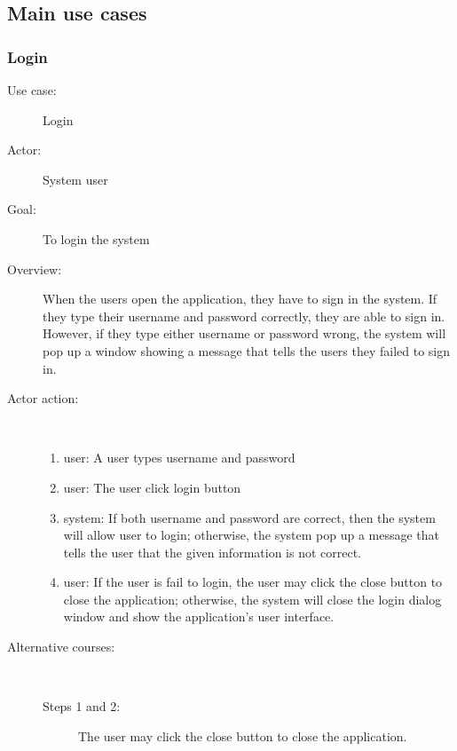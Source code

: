 \documentclass[11pt, oneside]{article}   	%
\begin{document}

\subsection{Main use cases}

\subsubsection{Login}
\begin{description}
\item[Use case:] Login
\item[Actor:] System user
\item[Goal:] To login the system
\item[Overview:] When the users open the application, they have to sign in the system. 
If they type their username and password correctly, they are able to sign in. 
However, if they type either username or password wrong, the system will pop up a window showing a message that tells the users they failed to sign in.
\item[Actor action:]
\
\begin{enumerate}
\item user: A user types username and password
\item user: The user click login button
\item system: If both username and password are correct, then the system will allow user to login; otherwise, the system pop up a message that tells the user that the given information is not correct.
\item user: If the user is fail to login, the user may click the close button to close the application; otherwise, the system will close the login dialog window and show the application's user interface.
\end{enumerate}

\item[Alternative courses:]
\
\begin{description}
\item[Steps 1 and 2:] The user may click the close button to close the application.
\end{description}

\end{description}
\end{document}
